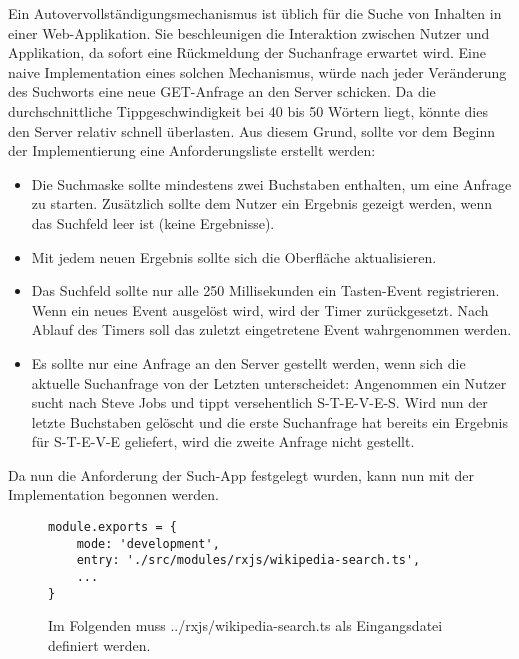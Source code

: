 Ein Autovervollständigungsmechanismus ist üblich für die Suche von Inhalten in einer Web-Applikation. Sie beschleunigen die Interaktion zwischen Nutzer und Applikation, da sofort eine Rückmeldung der Suchanfrage erwartet wird. Eine naive Implementation eines solchen Mechanismus, würde nach jeder Veränderung des Suchworts eine neue GET-Anfrage an den Server schicken. Da die durchschnittliche Tippgeschwindigkeit bei 40 bis 50 Wörtern liegt, könnte dies den Server relativ schnell überlasten. Aus diesem Grund, sollte vor dem Beginn der Implementierung eine Anforderungsliste erstellt werden:

\begin{itemize}
 \item Die Suchmaske sollte mindestens zwei Buchstaben enthalten, um eine Anfrage zu starten. Zusätzlich sollte dem Nutzer ein Ergebnis gezeigt werden, wenn das Suchfeld leer ist (keine Ergebnisse).
 \item Mit jedem neuen Ergebnis sollte sich die Oberfläche aktualisieren. 
 \item Das Suchfeld sollte nur alle 250 Millisekunden ein Tasten-Event registrieren. Wenn ein neues Event ausgelöst wird, wird der Timer zurückgesetzt. Nach Ablauf des Timers soll das zuletzt eingetretene Event wahrgenommen werden.
 \item Es sollte nur eine Anfrage an den Server gestellt werden, wenn sich die aktuelle Suchanfrage von der Letzten unterscheidet: Angenommen ein Nutzer sucht nach Steve Jobs und tippt versehentlich \glqq S-T-E-V-E-S\grqq{}. Wird nun der letzte Buchstaben gelöscht und die erste Suchanfrage hat bereits ein Ergebnis für \glqq S-T-E-V-E\grqq{} geliefert, wird die zweite Anfrage nicht gestellt.
\end{itemize}

\noindent
Da nun die Anforderung der Such-App festgelegt wurden, kann nun mit der Implementation begonnen werden.

\begin{figure}[H]
\begin{lstlisting}[basicstyle=\small]
module.exports = {
    mode: 'development',
    entry: './src/modules/rxjs/wikipedia-search.ts',
    ...
}
\end{lstlisting}
\caption{Im Folgenden muss ../rxjs/wikipedia-search.ts als Eingangsdatei definiert werden.}
\end{figure}

